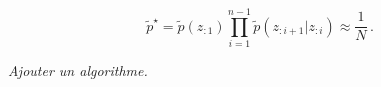 \begin{equation}
    \tilde p^\star = \tilde p(z_{:1}) \prod_{i=1}^{n-1} \tilde p(z_{:i+1}|z_{:i}) \approx \frac1N \,.
\end{equation}



\textcolor{mydarkred}{\textit{Ajouter un algorithme.}}